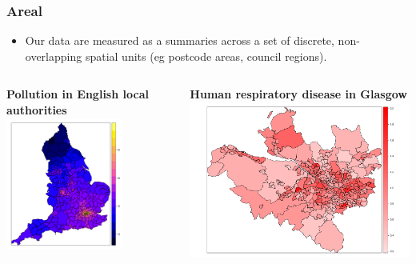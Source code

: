 \documentclass[parskip,12pt]{beamer}
\begin{document}
\begin{frame}
\frametitle{Areal}
 \begin{itemize}
\vspace{3mm}
\item Our data are measured as a summaries across a set of discrete, non-overlapping spatial units (eg postcode areas, council regions).
\end{itemize}
\begin{columns}
\begin{column}{0.5\textwidth}
    \begin{center}
    \textbf{Pollution in English local authorities}
     \includegraphics[width=0.7\textwidth]{EnglandPollution}
          \end{center}
\end{column}
\begin{column}{0.5\textwidth}
    \begin{center}
    \textbf{Human respiratory disease in Glasgow}
     \includegraphics[width=\textwidth]{GlasgowResp}
          \end{center}
\end{column}
\end{columns}
\end{frame}
\end{document}
